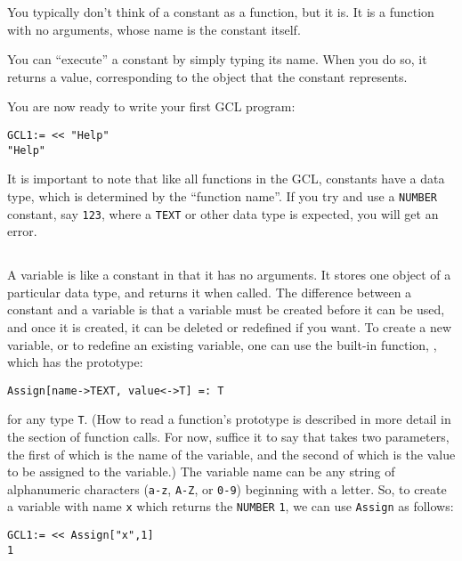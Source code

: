 You typically don't think of a constant as a function, but it is.  It
is a function with no arguments, whose name is the constant itself.

You can ``execute'' a constant by simply typing its name.  When you do
so, it returns a value, corresponding to the object that the constant
represents.  

You are now ready to write your first GCL program:

\begin{verbatim}
GCL1:= << "Help"
"Help"
\end{verbatim}

It is important to note that like all functions in the GCL, constants
have a data type, which is determined by the ``function name''.  If
you try and use a \verb+NUMBER+ constant, say \verb+123+, where a
\verb+TEXT+ or other data type is expected, you will get an error.

\subsection{}

A variable is like a constant in that it has no arguments.  It stores
one object of a particular data type, and returns it when called. The
difference between a constant and a variable is that a variable must
be created before it can be used, and once it is created, it can be
deleted or redefined if you want.  To create a new variable, or to
redefine an existing variable, one can use the built-in function,
, which has the prototype:
\begin{verbatim}
Assign[name->TEXT, value<->T] =: T
\end{verbatim}
\noindent 
for any type \verb+T+.  (How to read a function's prototype is
described in more detail in the section of function calls.  For now,
suffice it to say that  takes two parameters, the first of
which is the name of the variable, and the second of which is the
value to be assigned to the variable.)  The variable name can be any
string of alphanumeric characters (\verb+a-z+, \verb+A-Z+, or
\verb+0-9+) beginning with a letter.  So, to create a variable with
name \verb+x+ which returns the \verb+NUMBER+ \verb+1+, we can use
\verb+Assign+ as follows:

\begin{verbatim}
GCL1:= << Assign["x",1]
1
\end{verbatim}


